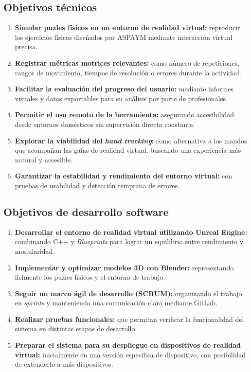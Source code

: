 \subsection{Objetivos técnicos}
\label{Objetivos técnicos}
\begin{enumerate}
    \item \textbf{Simular puzles físicos en un entorno de realidad virtual:} reproducir los ejercicios físicos diseñados por ASPAYM mediante interacción virtual precisa.
    
    \item \textbf{Registrar métricas motrices relevantes:} como número de repeticiones, rangos de movimiento, tiempos de resolución o errores durante la actividad.
    
    \item \textbf{Facilitar la evaluación del progreso del usuario:} mediante informes visuales y datos exportables para su análisis por parte de profesionales.
    
    \item \textbf{Permitir el uso remoto de la herramienta:} asegurando accesibilidad desde entornos domésticos sin supervisión directa constante.
    
    \item \textbf{Explorar la viabilidad del \textit{hand tracking}:} como alternativa a los mandos que acompañan las gafas de realidad virtual, buscando una experiencia más natural y accesible.
    
    \item \textbf{Garantizar la estabilidad y rendimiento del entorno virtual:} con pruebas de usabilidad y detección temprana de errores.
\end{enumerate}

\subsection{Objetivos de desarrollo software}
\label{Objetivos de desarrollo}
\begin{enumerate}
    \item \textbf{Desarrollar el entorno de realidad virtual utilizando Unreal Engine:} combinando C++ y \textit{Blueprints} para lograr un equilibrio entre rendimiento y modularidad.
    
    \item \textbf{Implementar y optimizar modelos 3D con Blender:} representando fielmente los puzles físicos y el entorno de trabajo.
    
    \item \textbf{Seguir un marco ágil de desarrollo (SCRUM):} organizando el trabajo en \textit{sprints} y manteniendo una comunicación clara mediante GitLab.
    
    \item \textbf{Realizar pruebas funcionales:} que permitan verificar la funcionalidad del sistema en distintas etapas de desarrollo.
    
    \item \textbf{Preparar el sistema para su despliegue en dispositivos de realidad virtual:} inicialmente en una versión específica de dispositivo, con posibilidad de extenderlo a más dispositivos.
\end{enumerate}